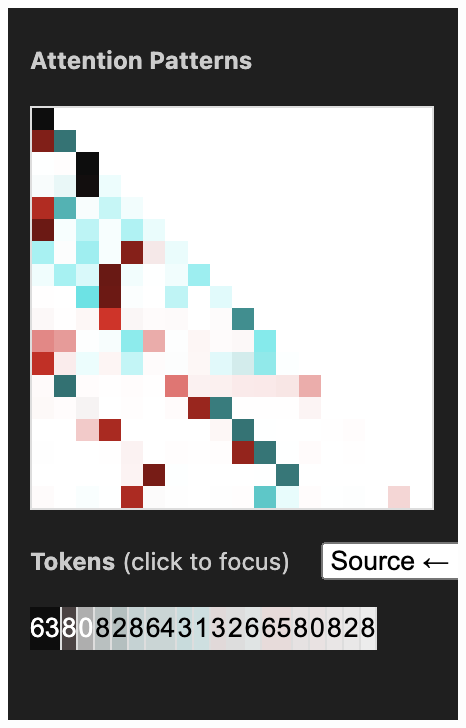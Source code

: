 \documentclass{article}
\begin{document}
\begin{center}
    \includegraphics[scale=0.4]{images/att_encoding_2hd.png}

\end{center}
\end{document}
